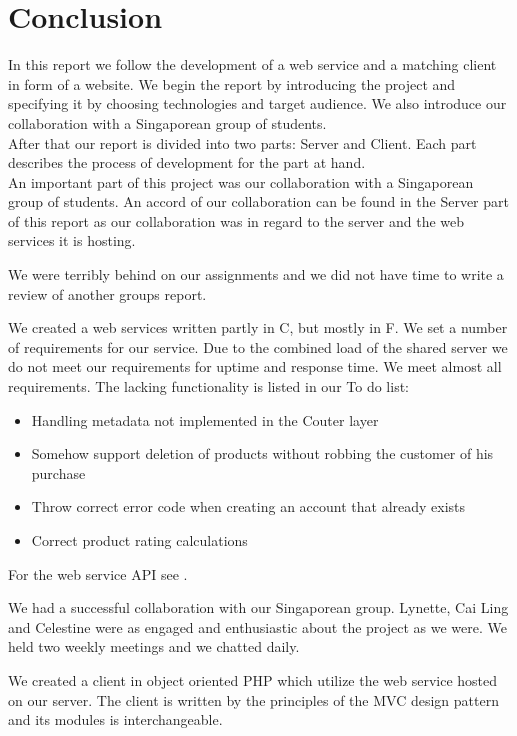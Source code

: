 \section{Conclusion}
In this report we follow the development of a web service and a matching client in form of a website. We begin the report by introducing the project and specifying it by choosing technologies and target audience. We also introduce our collaboration with a Singaporean group of students.
\\After that our report is divided into two parts: Server and Client. Each part describes the process of development for the part at hand.
\\An important part of this project was our collaboration with a Singaporean group of students. An accord of our collaboration can be found in the Server part of this report as our collaboration was in regard to the server and the web services it is hosting.

We were terribly behind on our assignments and we did not have time to write a review of another groups report.

We created a web services written partly in C\Sh, but mostly in F\Sh. We set a number of requirements for our service. Due to the combined load of the shared server we do not meet our requirements for uptime and response time. We meet almost all requirements. The lacking functionality is listed in our To do list:
\begin{itemize}
\item Handling metadata not implemented in the C\Sh outer layer
\item Somehow support deletion of products without robbing the customer of his purchase
\item Throw correct error code when creating an account that already exists
\item Correct product rating calculations
\end{itemize}
\mbox{}For the web service API see .

We had a successful collaboration with our Singaporean group. Lynette, Cai Ling and Celestine were as engaged and enthusiastic about the project as we were. We held two weekly meetings and we chatted daily.

We created a client in object oriented PHP which utilize the web service hosted on our server. The client is written by the principles of the MVC design pattern and its modules is interchangeable.

